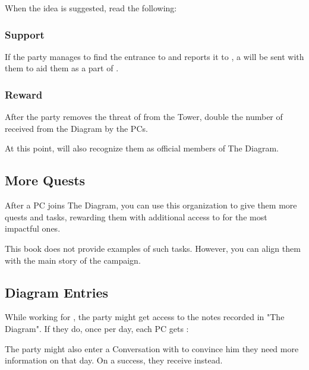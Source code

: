 When the idea is suggested, read the following:


\subsubsection{Support}

If the party manages to find the entrance to  and reports it to \npcTaravangian{}, a \enemyDiagramSurgeon{} will be sent with them to aid them as a part of .

\subsubsection{Reward}

After the party removes the threat of \npcMidnightMother{} from the Tower, double the number of \abilityFutureKnowledgeName[N] received from the Diagram by the PCs.

At this point, \npcTaravangian{} will also recognize them as official members of The Diagram.




\subsection{More Quests}

After a PC joins The Diagram, you can use this organization to give them more quests and tasks, rewarding them with additional access to \abilityFutureKnowledgeName[2] for the most impactful ones.

This book does not provide examples of such tasks. However, you can align them with the main story of the campaign.




\subsection{Diagram Entries}

While working for \npcTaravangian{}, the party might get access to the notes recorded in "The Diagram". If they do, once per day, each PC gets \abilityFutureKnowledgeName[1]:

\abilityFutureKnowledge[N]

The party might also enter a Conversation with \npcTaravangian{} to convince him they need more information on that day. On a success, they receive \abilityFutureKnowledgeName[2] instead.

